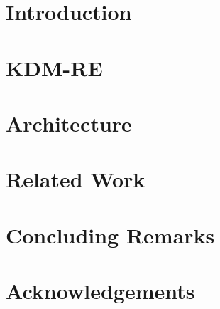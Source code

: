 \documentclass[12pt]{article}
\title{\papertitle}
\author{Rafael S. Durelli\inst{1,3}, M\'{a}rcio E. Delamaro\inst{1} and Valter V. de Camargo\inst{2}}
\begin{document}
 

\maketitle

\begin{abstract}

\end{abstract}
\section{Introduction\label{sec:introduction}}
 

% 

\section{KDM-RE\label{sec:KDM-RE}} 


%	


\section{Architecture\label{sec:architecture}}
 

\section{Related Work\label{sec:related}}
 

\section{Concluding Remarks\label{sec:conclusion}}
 

\section{Acknowledgements}
 



\end{document}
